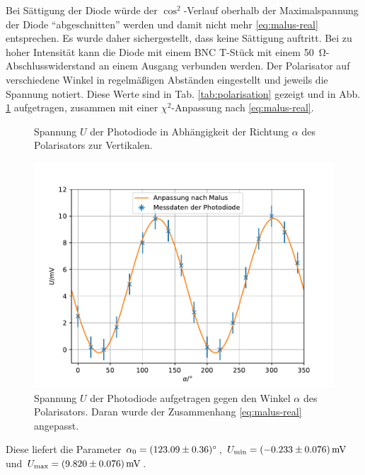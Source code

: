 \documentclass{article}
\newcommand*{\tablePath}{../data} %
\newcommand{\mr}{\mathrm}
\begin{document}
Bei Sättigung der Diode würde der $\cos^2$-Verlauf oberhalb der Maximalspannung der Diode \enquote{abgeschnitten} werden
und damit nicht mehr \eqref{eq:malus-real} entsprechen. Es wurde daher sichergestellt, dass keine Sättigung auftritt.
Bei zu hoher Intensität kann die Diode mit einem BNC T-Stück mit einem \SI{50}{\ohm}-Abschlusswiderstand an einem Ausgang 
verbunden werden.
Der Polarisator auf verschiedene Winkel in regelmäßigen Abständen eingestellt und jeweils die Spannung notiert.
Diese Werte sind in Tab. \ref{tab:polarisation} gezeigt und in Abb. \ref{fig:polarisation} aufgetragen, zusammen
mit einer $\chi^2$-Anpassung nach \eqref{eq:malus-real}.
\begin{figure}[h]
  \begin{minipage}{0.49\textwidth}
    \centering
    
    \caption{Spannung $U$ der Photodiode in Ab\-hängig\-keit der Richtung $\alpha$ des Polarisators zur Vertikalen.}
    \label{tab:polarisation}
  \end{minipage}
  \begin{minipage}{0.49\textwidth}
    \centering
    \includegraphics[width=\textwidth]{5.4polarisation}
    \caption{
      Spannung $U$ der Photodiode aufgetragen gegen den Winkel $\alpha$ des Polarisators.
      Daran wurde der Zusammenhang \eqref{eq:malus-real} angepasst.}
    \label{fig:polarisation}
  \end{minipage}
\end{figure}

Diese liefert die Parameter $\alpha_0 = \SI{123.09\pm0.36}{\degree}$,
$U_\mr{min} = \SI{-0.233\pm0.076}{\mV}$ und $U_\mr{max} = \SI{9.82\pm0.076}{\mV}$.
\end{document}
